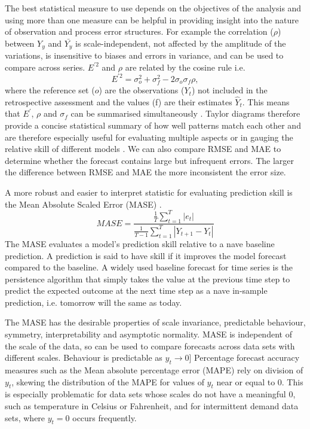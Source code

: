 The best statistical measure to use depends on the objectives of the analysis and using more than one measure can be helpful in providing insight into the nature of observation and process error structures. For example the correlation ($\rho$) between $Y_y$ and $\bar{Y_y}$ is scale-independent, not affected by the amplitude of the variations, is insensitive to biases and errors in variance, and can be used to compare across series. $E^{\prime 2}$ and $\rho$ are related by the cosine rule i.e.
\begin{equation} 
E^{\prime 2} = \sigma_o^2 + \sigma_f^2 - 2\sigma_o\sigma_f\rho, 
\end{equation}
where the reference set ($o$) are the observations ($Y_t$) not included in the retrospective assessment and the values (f) are their estimates ${\hat{Y}_t}$. This means that $E^\prime$, $\rho$ and $\sigma_f$ can be summarised simultaneously  \citep{taylor2001summarizing}. Taylor diagrams therefore provide a concise statistical summary of how well patterns match each other and are therefore especially useful for evaluating multiple aspects or in gauging the relative skill of different models \citep{griggs2002climate}. We can also compare RMSE and MAE to determine whether the forecast contains large but infrequent errors. The larger the difference between RMSE and MAE the more inconsistent the error size.

A more robust and easier to interpret statistic for evaluating prediction skill is the Mean Absolute Scaled Error (MASE) \citep{hyndman2006another}.
\begin{equation} 
{MASE}=
\frac{\frac{1}{T} \sum_{t=1}^{T} \left|e_{t}\right|}
{\frac{1}{T-1} \sum_{t=1}^{T} \left|Y_{t+1}-Y_{t}\right|} 
\end{equation}
The MASE evaluates a model’s prediction skill relative to a nave baseline prediction. A prediction is said to have skill if it improves the model forecast compared to the baseline. A widely used baseline forecast for time series is the persistence algorithm that simply takes the value at the previous time step to predict the expected outcome at the next time step as a nave in-sample prediction, i.e. tomorrow will the same as today. 

The MASE has the desirable properties of scale invariance, predictable behaviour, symmetry, interpretability and asymptotic normality. MASE is independent of the scale of the data, so can be used to compare forecasts across data sets with different scales. Behaviour is predictable as $y_{t}\rightarrow 0$] Percentage forecast accuracy measures such as the Mean absolute percentage error (MAPE) rely on division of $y_{t}$, skewing the distribution of the MAPE for values of $y_{t}$ near or equal to 0. This is especially problematic for data sets whose scales do not have a meaningful 0, such as temperature in Celsius or Fahrenheit, and for intermittent demand data sets, where $y_{t}=0$  occurs frequently.

